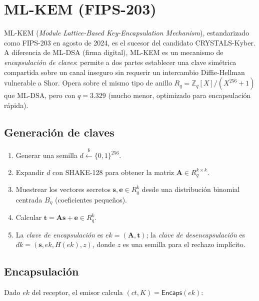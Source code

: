 \section{ML-KEM (FIPS-203)}
\label{sec:mlkem}

ML-KEM (\emph{Module Lattice-Based Key-Encapsulation Mechanism}), estandarizado como FIPS-203 \parencite{nistfips203} en agosto de 2024, es el sucesor del candidato CRYSTALS-Kyber. A diferencia de ML-DSA (firma digital), ML-KEM es un mecanismo de \emph{encapsulación de claves}: permite a dos partes establecer una clave simétrica compartida sobre un canal inseguro sin requerir un intercambio Diffie-Hellman vulnerable a Shor. Opera sobre el mismo tipo de anillo $R_q = \mathbb{Z}_q[X]/(X^{256}+1)$ que ML-DSA, pero con $q = 3.329$ (mucho menor, optimizado para encapsulación rápida).

\subsection{Generación de claves}

\begin{enumerate}
  \item Generar una semilla $d \xleftarrow{\$} \{0,1\}^{256}$.
  \item Expandir $d$ con SHAKE-128 para obtener la matriz $\mathbf{A} \in R_q^{k \times k}$.
  \item Muestrear los vectores secretos $\mathbf{s}, \mathbf{e} \in R_q^k$ desde una distribución binomial centrada $B_\eta$ (coeficientes pequeños).
  \item Calcular $\mathbf{t} = \mathbf{A}\mathbf{s} + \mathbf{e} \in R_q^k$.
  \item La \emph{clave de encapsulación} es $ek = (\mathbf{A}, \mathbf{t})$; la \emph{clave de desencapsulación} es $dk = (\mathbf{s}, ek, H(ek), z)$, donde $z$ es una semilla para el rechazo implícito.
\end{enumerate}

\subsection{Encapsulación}

Dado $ek$ del receptor, el emisor calcula $(ct, K) = \textsf{Encaps}(ek)$:

